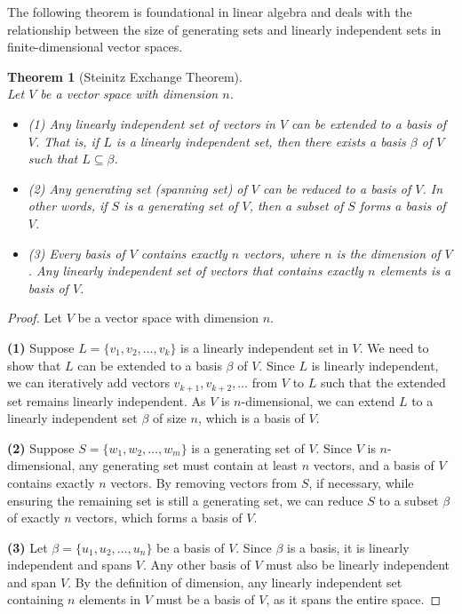 \documentclass[12pt, reqno]{amsart}
\newtheorem{theorem}{Theorem}[section]
\theoremstyle{definition}
\numberwithin{equation}{section}
\begin{document}
The following theorem is foundational in linear algebra and deals with the relationship between the size of generating sets and linearly independent sets in finite-dimensional vector spaces.
    
    \begin{theorem}[Steinitz Exchange Theorem] \hfill \\
Let $V$ be a vector space with dimension $n$.

\begin{itemize}
    \item (1) Any linearly independent set of vectors in $V$ can be extended to a basis of $V$. That is, if $L$ is a linearly independent set, then there exists a basis $\beta$ of $V$ such that $L \subseteq \beta$.
    
    \item (2) Any generating set (spanning set) of $V$ can be reduced to a basis of $V$. In other words, if $S$ is a generating set of $V$, then a subset of $S$ forms a basis of $V$.
    
    \item (3) Every basis of $V$ contains exactly $n$ vectors, where $n$ is the dimension of $V$. Any linearly independent set of vectors that contains exactly $n$ elements is a basis of $V$.
\end{itemize}
    \end{theorem}

\begin{proof}
Let $V$ be a vector space with dimension $n$.

\textbf{(1)} Suppose $L = \{v_1, v_2, \dots, v_k\}$ is a linearly independent set in $V$. We need to show that $L$ can be extended to a basis $\beta$ of $V$. Since $L$ is linearly independent, we can iteratively add vectors $v_{k+1}, v_{k+2}, \dots$ from $V$ to $L$ such that the extended set remains linearly independent. As $V$ is $n$-dimensional, we can extend $L$ to a linearly independent set $\beta$ of size $n$, which is a basis of $V$.

\textbf{(2)} Suppose $S = \{w_1, w_2, \dots, w_m\}$ is a generating set of $V$. Since $V$ is $n$-dimensional, any generating set must contain at least $n$ vectors, and a basis of $V$ contains exactly $n$ vectors. By removing vectors from $S$, if necessary, while ensuring the remaining set is still a generating set, we can reduce $S$ to a subset $\beta$ of exactly $n$ vectors, which forms a basis of $V$.

\textbf{(3)} Let $\beta = \{u_1, u_2, \dots, u_n\}$ be a basis of $V$. Since $\beta$ is a basis, it is linearly independent and spans $V$. Any other basis of $V$ must also be linearly independent and span $V$. By the definition of dimension, any linearly independent set containing $n$ elements in $V$ must be a basis of $V$, as it spans the entire space.
\end{proof}
\end{document}
